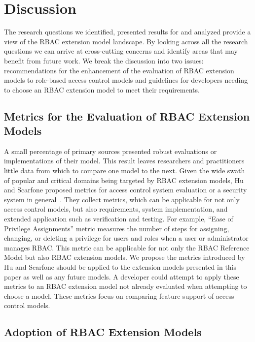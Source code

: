 \section{Discussion} \label{sec:discussion}

The research questions we identified, presented results for and analyzed provide a view of the RBAC extension model landscape. 
By looking across all the research questions we can arrive at cross-cutting concerns and identify areas that may benefit from future work.
We break the discussion into two issues: recommendations for the enhancement of the evaluation of RBAC extension models to role-based access control models and guidelines for developers needing to choose an RBAC extension model to meet their requirements.

\subsection{Metrics for the Evaluation of RBAC Extension Models}

A small percentage of primary sources presented robust evaluations or implementations of their model. 
This result leaves researchers and practitioners little data from which to compare one model to the next. 
Given the wide swath of popular and critical domains being targeted by RBAC extension models, Hu and Scarfone proposed metrics for access control system evaluation or a security system in general~\cite{hu2012:NIST7874}. 
They collect metrics, which can be applicable for not only access control models, but also requirements, system implementation, and extended application such as verification and testing. 
For example, ``Ease of Privilege Assignments'' metric measures the number of steps for assigning, changing, or deleting a privilege for users and roles when a user or administrator manages RBAC. 
This metric can be applicable for not only the RBAC Reference Model but also RBAC extension models.
We propose the metrics introduced by Hu and Scarfone should be applied to the extension models presented in this paper as well as any future models.
A developer could attempt to apply these metrics to an RBAC extension model not already evaluated when attempting to choose a model. 
These metrics focus on comparing feature support of access control models.


\subsection{Adoption of RBAC Extension Models}

